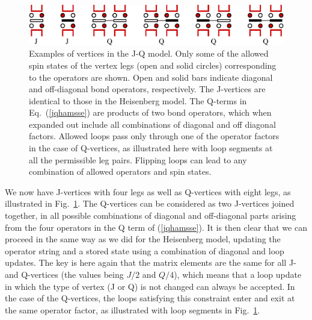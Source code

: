 \documentclass[draft,numberedheadings]{aipproc}
\begin{document}
\begin{figure}
\includegraphics[width=13cm, clip]{jqvertices.eps}
\caption{Examples of vertices in the J-Q model. Only some of the allowed spin states of the vertex legs (open and solid circles) corresponding 
to the operators are shown. Open and solid bars indicate diagonal and off-diagonal bond operators, respectively. The J-vertices are identical 
to those in the Heisenberg model. The Q-terms in Eq.~(\ref{jqhamsse}) are products of two bond operators, which when expanded out include all 
combinations of diagonal and off diagonal factors. Allowed loops pass only through one of the operator factors in the case of Q-vertices, as 
illustrated here with loop segments at all the permissible leg pairs. Flipping loops can lead to any combination of allowed operators and spin 
states.}
\label{jqvertices}
\end{figure}

We now have J-vertices with four legs as well as Q-vertices with eight legs, as illustrated in Fig.~\ref{jqvertices}. The Q-vertices can be considered 
as two J-vertices joined together, in all possible combinations of diagonal and off-diagonal parts arising from the four operators in the Q term of 
(\ref{jqhamsse}). It is then clear that we can proceed in the same way as we did for the Heisenberg model, updating the operator string and a stored 
state using a combination of diagonal and loop updates. The key is here again that the matrix elements are the same for all J- and Q-vertices (the 
values being $J/2$ and $Q/4$), which means that a loop update in which the type of vertex (J or Q) is not changed can always be accepted. In the 
case of the Q-vertices, the loops satisfying this constraint enter and exit at the same operator factor, as illustrated with loop segments in 
Fig.~\ref{jqvertices}.
\end{document}
